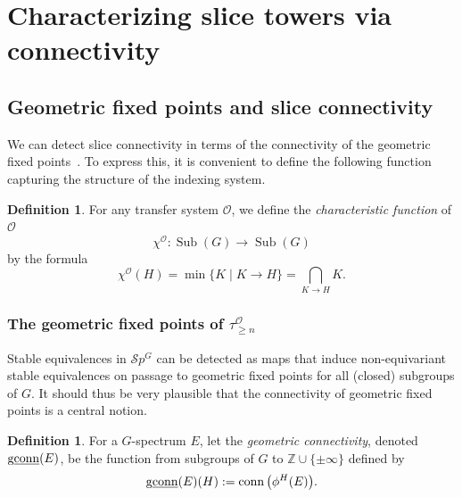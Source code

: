 \documentclass{amsart}
\newcommand{\Z}{{\mathbb  Z}}
\DeclareMathOperator{\Sub}{Sub}
\newcommand{\m}[1]{{\protect\underline{#1}}}
\newcommand{\cc}[1]{\mathcal #1}
\newcommand{\cO}{\cc{O}}
\newcommand{\Sp}{\mathcal Sp}
\DeclareMathOperator{\conn}{conn}
\DeclareMathOperator{\mgconn}{g\m{\conn}}
\numberwithin{equation}{section}
\theoremstyle{remark}
\theoremstyle{definition}
\newtheorem{definition}[theorem]{Definition}
\begin{document}
\section{Characterizing slice towers via connectivity}\label{sec: connectivity}

\subsection{Geometric fixed points and slice connectivity}

We can detect slice connectivity in terms of the connectivity of the geometric fixed points~\cite{HillYarnall, WilsonSlice}.  To express this, it is convenient to define the following function capturing the structure of the indexing system.

\begin{definition}
    For any transfer system \(\cO\), we define the {\em characteristic function} of $\cO$ 
    \[
        \chi^{\cO}\colon\Sub(G)\to\Sub(G)
    \]
    by the formula
    \[
        \chi^{\cO}(H)=\min\{K\mid K\to H\}=\bigcap_{K\to H} K.
    \]
\end{definition}

\subsubsection{The geometric fixed points of \(\tau_{\geq n}^{\cO}\)}

Stable equivalences in $\Sp^G$ can be detected as maps that induce non-equivariant stable equivalences on passage to geometric fixed points for all (closed) subgroups of $G$.  It should thus be very plausible that the connectivity of geometric fixed points is a central notion.

\begin{definition}
    For a \(G\)-spectrum \(E\), let the {\em geometric connectivity}, denoted \(\mgconn(E)\), be the function from subgroups of \(G\) to \(\Z\cup\{\pm\infty\}\) defined by
    \[
        \mgconn(E)(H):= \conn\big(\phi^H(E)\big).
    \]
\end{definition}
\end{document}
